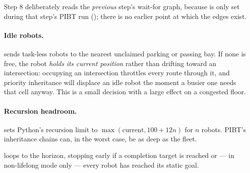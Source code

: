Step 8 deliberately reads the \emph{previous} step's wait-for graph, because
 is only set during that step's PIBT run
(); there is no earlier point at which the edges exist.

\paragraph{Idle robots.}  sends task-less robots to
the nearest unclaimed parking or passing bay. If none is free, the robot
\emph{holds its current position} rather than drifting toward an intersection:
occupying an intersection throttles every route through it, and priority
inheritance will displace an idle robot the moment a busier one needs that cell
anyway. This is a small decision with a large effect on a congested floor.

\paragraph{Recursion headroom.}  sets Python's
recursion limit to $\max(\text{current}, 100 + 12n)$ for $n$ robots. PIBT's
inheritance chains can, in the worst case, be as deep as the fleet.

 loops to the horizon,
stopping early if a completion target is reached or --- in non-lifelong mode
only --- every robot has reached its static goal.
